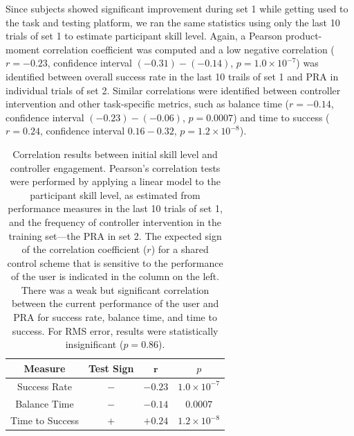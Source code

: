 Since subjects showed significant improvement during set 1 while getting used to the task and testing platform, we ran the same statistics using only the last 10 trials of set 1 to estimate participant skill level. Again, a Pearson product-moment correlation coefficient was computed and a low negative correlation ($r=-0.23$, confidence interval $(-0.31)-(-0.14)$, $p=1.0\times 10^{-7}$) was identified between overall success rate in the last 10 trails of set 1 and PRA in individual trials of set 2. Similar correlations were identified between controller intervention and other task-specific metrics, such as balance time ($r=-0.14$, confidence interval $(-0.23)-(-0.06)$, $p=0.0007$) and time to success ($r=0.24$, confidence interval $0.16-0.32$, $p=1.2\times 10^{-8}$).


\begin{table}[!h]
\begin{tabular}{c|c|c|c}
\textbf{Measure} & Test Sign & $\mathbf{r}$ & $p$ \\
\hline \hline
Success Rate & $-$& $\mathbf{-0.23}$ &  $1.0\times 10^{-7}$ \\
Balance Time & $-$& $\mathbf{-0.14}$ & $0.0007$ \\
Time to Success & $+$ & $\mathbf{+0.24}$ & $1.2\times 10^{-8}$ \\
\end{tabular}
\vspace{0.7cm}
\caption{Correlation results between initial skill level and controller engagement. Pearson's correlation tests were performed by applying a linear model to the participant skill level, as estimated from performance measures in the last 10 trials of set 1, and the frequency of controller intervention in the training set---the PRA in set 2. The expected sign of the correlation coefficient ($r$) for a shared control scheme that is sensitive to the performance of the user is indicated in the column on the left. There was a weak but significant correlation between the current performance of the user and PRA for success rate, balance time, and time to success. For RMS error, results were statistically insignificant ($p=0.86$). }
\label{tab: initial skill}
\end{table}

